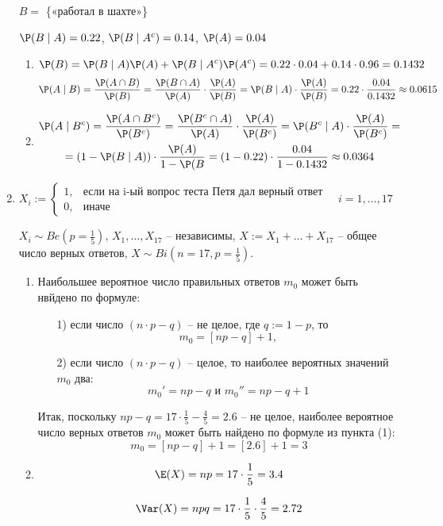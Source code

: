 \begin{enumerate}
$B=$ \{«работал в шахте»\}

$\P (B \mid A) = 0.22$, $\P (B \mid A^c) = 0.14$, $\P (A) = 0.04$
\begin{enumerate}
\item \[\P (B) = \P (B \mid A) \P(A) + \P (B \mid A^c) \P (A^c) = 0.22 \cdot 0.04 + 0.14 \cdot 0.96 = 0.1432\]
\[\P(A \mid B) = \frac{\P(A\cap B)}{\P (B)} = \frac{\P (B \cap A)}{\P(A)} \cdot \frac{\P(A)}{\P (B)} = \P (B \mid A) \cdot \frac{\P(A)}{\P (B)} = 0.22 \cdot \frac{0.04}{0.1432} \approx 0.0615\]

\item
\begin{multline*}
\P  (A \mid B^c) =  \frac{\P(A\cap B^c)}{\P (B^c)} =  \frac{\P (B^c \cap A)}{\P(A)} \cdot \frac{\P(A)}{\P (B^c)} = \P (B^c \mid A) \cdot \frac{\P(A)}{\P (B^c)} = \\
= (1-\P (B \mid A)) \cdot \frac{\P(A)}{1-\P (B} = (1-0.22) \cdot \frac{0.04}{1-0.1432} \approx 0.0364
\end{multline*}
\end{enumerate}
\item $X_i :=
\begin{cases}
1, & \text{если на i-ый вопрос теста Петя дал верный ответ} \\
0, & \text{иначе}
\end{cases}
\quad i = 1, \ldots, 17
$

$X_i \sim Be\left(p=\frac{1}{5}\right)$, $X_1, \ldots, X_{17}$ – независимы, $X:= X_1 + \ldots + X_{17}$ – общее число верных ответов, $X \sim Bi\left(n=17, p=\frac{1}{5}\right)$.
\begin{enumerate}
\item Наибольшее вероятное число правильных ответов $m_0$ может быть нвйдено по формуле:
\begin{enumerate}
\item[1)] если число $(n\cdot p - q)$ – не целое, где $q:=1-p$, то
\[
m_0 = [np-q] +1,
\]
\item[2)] если число  $(n\cdot p - q)$ – целое, то наиболее вероятных значений $m_0$ два:
\[
m_0' = np-q \text{ и } m_0'' = np-q+1
\]
\end{enumerate}
Итак, поскольку $np-q = 17\cdot\frac{1}{5} - \frac{4}{5} = 2.6$ – не целое, наиболее вероятное число верных ответов $m_0$ может быть найдено по формуле из пункта (1):
\[
m_0 = [np-q] +1 = [2.6] + 1 = 3
\]
\item \[\E(X) = np = 17 \cdot \frac{1}{5}=3.4\]

\[\Var(X) = npq = 17 \cdot \frac{1}{5} \cdot \frac{4}{5} = 2.72\]


\end{enumerate}
\end{enumerate}
